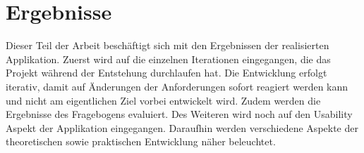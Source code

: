 \chapter{Ergebnisse}\label{sec:results}

Dieser Teil der Arbeit beschäftigt sich mit den Ergebnissen der realisierten Applikation. Zuerst wird auf die einzelnen Iterationen eingegangen, die das Projekt während der Entstehung durchlaufen hat.
Die Entwicklung erfolgt iterativ, damit auf Änderungen der Anforderungen sofort reagiert werden kann und nicht am eigentlichen Ziel vorbei entwickelt wird. Zudem werden die Ergebnisse des Fragebogens evaluiert. Des Weiteren wird noch auf den Usability Aspekt der Applikation eingegangen. Daraufhin werden verschiedene Aspekte der theoretischen sowie praktischen Entwicklung näher beleuchtet.

